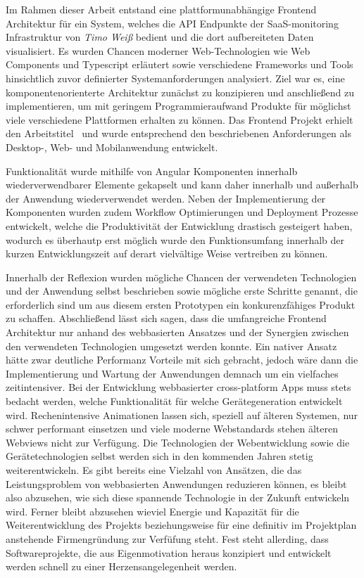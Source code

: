 Im Rahmen dieser Arbeit entstand eine plattformunabhängige Frontend Architektur für ein System,
welches die API Endpunkte der SaaS-monitoring Infrastruktur von \emph{Timo Weiß} bedient und die dort aufbereiteten Daten visualisiert.
Es wurden Chancen moderner Web-Technologien wie Web Components und Typescript erläutert
sowie verschiedene Frameworks und Tools hinsichtlich zuvor definierter Systemanforderungen analysiert.
Ziel war es, eine komponentenorienterte Architektur zunächst zu konzipieren und anschließend zu implementieren, um
mit geringem Programmieraufwand Produkte für möglichst viele verschiedene Plattformen erhalten zu können.
Das Frontend Projekt erhielt den Arbeitstitel \projectname{} und wurde entsprechend den beschriebenen Anforderungen
als Desktop-, Web- und Mobilanwendung entwickelt.

Funktionalität wurde mithilfe von Angular Komponenten innerhalb wiederverwendbarer
Elemente gekapselt und kann daher innerhalb und außerhalb der Anwendung wiederverwendet werden.
Neben der Implementierung der Komponenten wurden zudem Workflow Optimierungen und Deployment Prozesse entwickelt,
welche die Produktivität der Entwicklung drastisch gesteigert haben, wodurch es überhautp erst möglich wurde den Funktionsumfang
innerhalb der kurzen Entwicklungszeit auf derart vielvältige Weise vertreiben zu können.

Innerhalb der Reflexion wurden mögliche Chancen der verwendeten Technologien und der Anwendung selbst beschrieben
sowie mögliche erste Schritte genannt, die erforderlich sind um aus diesem ersten
Prototypen ein konkurenzfähiges Produkt zu schaffen.
Abschließend lässt sich sagen, dass die umfangreiche Frontend Architektur nur anhand des webbasierten Ansatzes und der Synergien zwischen den verwendeten Technologien umgesetzt werden konnte.
Ein nativer Ansatz hätte zwar deutliche Performanz Vorteile mit sich gebracht, jedoch wäre dann die Implementierung und Wartung der Anwendungen demnach um ein vielfaches zeitintensiver.
Bei der Entwicklung webbasierter cross-platform Apps muss stets bedacht werden, welche Funktionalität für welche Gerätegeneration entwickelt wird.
Rechenintensive Animationen lassen sich, speziell auf älteren Systemen, nur schwer performant einsetzen und viele moderne Webstandards stehen älteren Webviews nicht zur Verfügung.
Die Technologien der Webentwicklung sowie die Gerätetechnologien selbst werden sich in den kommenden Jahren stetig weiterentwickeln. Es gibt bereits eine Vielzahl von Ansätzen, die das Leistungsproblem von webbasierten Anwendungen reduzieren können,
es bleibt also abzusehen, wie sich diese spannende Technologie in der Zukunft entwickeln wird.
Ferner bleibt abzusehen wieviel Energie und Kapazität für die Weiterentwicklung des Projekts \projectname{} beziehungsweise für eine definitiv im Projektplan anstehende Firmengründung zur Verfüfung steht.
Fest steht allerding, dass Softwareprojekte, die aus Eigenmotivation heraus konzipiert und entwickelt werden schnell zu einer Herzensangelegenheit werden.
